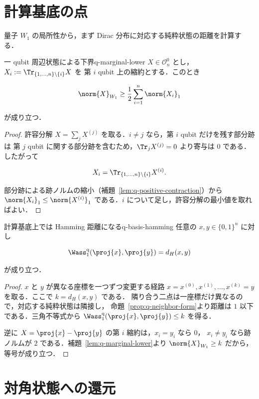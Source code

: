 \section{計算基底の点}

量子 $W_1$ の局所性から，まず Dirac 分布に対応する純粋状態の距離を計算する．

\begin{lemma}{一 qubit 周辺状態による下界}{q-marginal-lower}
  $X\in\mathcal{O}_n^0$ とし，$X_i:=\Tr_{\{1,\ldots,n\}\setminus\{i\}}X$ を
  第 $i$ qubit 上の縮約とする．このとき

  \[
    \norm{X}_{W_1}\geq\frac12\sum_{i=1}^n\norm{X_i}_1
  \]

  が成り立つ．
\end{lemma}

\begin{proof}
  許容分解 $X=\sum_jX^{(j)}$ を取る．$i\neq j$ なら，第 $i$ qubit だけを残す部分跡は
  第 $j$ qubit に関する部分跡を含むため，$\Tr_jX^{(j)}=0$ より寄与は $0$ である．したがって

  \[
    X_i=\Tr_{\{1,\ldots,n\}\setminus\{i\}}X^{(i)}.
  \]

  部分跡による跡ノルムの縮小（補題~\ref{lem:q-positive-contraction}）から
  $\norm{X_i}_1\leq\norm{X^{(i)}}_1$ である．$i$ について足し，許容分解の最小値を取ればよい．
\end{proof}

\begin{proposition}{計算基底上では Hamming 距離になる}{q-basis-hamming}
  任意の $x,y\in\{0,1\}^n$ に対し

  \[
    \Wass_1^{\rm q}(\proj{x},\proj{y})=d_H(x,y)
  \]

  が成り立つ．
\end{proposition}

\begin{proof}
  $x$ と $y$ が異なる座標を一つずつ変更する経路
  $x=x^{(0)},x^{(1)},\ldots,x^{(k)}=y$ を取る．ここで $k=d_H(x,y)$ である．
  隣り合う二点は一座標だけ異なるので，対応する純粋状態は隣接し，
  命題~\ref{prop:q-neighbor-form}より距離は $1$ 以下である．三角不等式から
  $\Wass_1^{\rm q}(\proj{x},\proj{y})\leq k$ を得る．

  逆に $X=\proj{x}-\proj{y}$ の第 $i$ 縮約は，$x_i=y_i$ なら $0$，
  $x_i\neq y_i$ なら跡ノルムが $2$ である．補題~\ref{lem:q-marginal-lower}より
  $\norm{X}_{W_1}\geq k$ だから，等号が成り立つ．
\end{proof}

\section{対角状態への還元}

